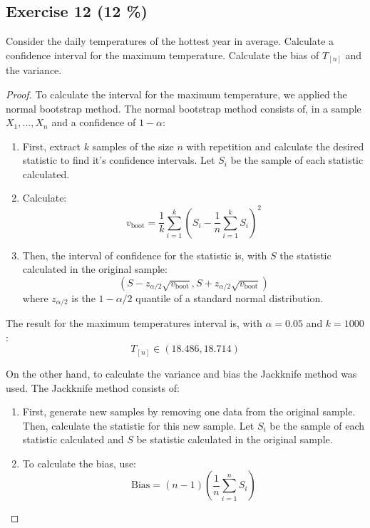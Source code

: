 \documentclass[11pt]{article}
\theoremstyle{definition}
\theoremstyle{remark}
\theoremstyle{remark}
\begin{document}
\subsection*{Exercise 12 (12 \%)}
Consider the daily temperatures of the hottest year in
average. Calculate a confidence interval for the maximum
temperature. Calculate the bias of $T_{[n]}$ and the variance.

\begin{proof}
  To calculate the interval for the maximum temperature, we applied
  the normal bootstrap method. The normal bootstrap method consists
  of, in a sample $X_1, \ldots, X_n$ and a confidence of $1 - \alpha$:
  \begin{enumerate}
  \item First, extract $k$ samples of the size $n$ with repetition and
    calculate the desired statistic to find it's confidence
    intervals.  Let $S_i$ be the sample of each statistic calculated.
  \item Calculate:
    \begin{equation*}
      v_{\text{boot}} = \frac{1}{k} \sum_{i=1}^k\left(S_i - \frac{1}{n}
        \sum_{i=1}^k S_i\right)^2
     \end{equation*}
   \item Then, the interval of confidence for the statistic is, with
     $S$ the statistic calculated in the original sample:
     \begin{equation*}
       (S - z_{\alpha/2} \sqrt{v_{\text{boot}}} , S + z_{\alpha/2} \sqrt{v_{\text{boot}}})
     \end{equation*}
     where $z_{\alpha/2}$ is the $1 - \alpha / 2$ quantile of a
     standard normal distribution.
   \end{enumerate}
   The result for the maximum temperatures interval is, with
   $\alpha=0.05$ and $k = 1000$:
   \begin{equation*}
     T_{[n]} \in (18.486, 18.714)
   \end{equation*}

   On the other hand, to calculate the variance and bias the Jackknife
   method was used. The Jackknife method consists of:
   \begin{enumerate}
   \item First, generate new samples by removing one data from the
     original sample. Then, calculate the statistic for this new
     sample. Let $S_i$ be the sample of each statistic calculated and
     $S$ be statistic calculated in the original sample.
   \item To calculate the bias, use:
     \begin{equation*}
       \text{Bias} = (n - 1) \left(\frac{1}{n} \sum_{i=1}^n S_i \right)
     \end{equation*}
   \end{enumerate}
 \end{proof}
\end{document}

